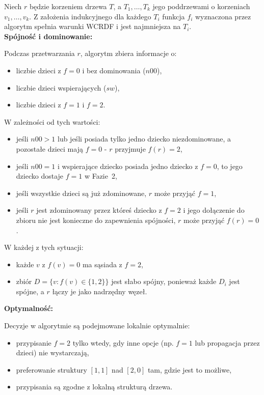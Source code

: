 Niech $r$ będzie korzeniem drzewa $T$, a $T_1, \dots, T_k$ jego poddrzewami o korzeniach $v_1, \dots, v_k$. Z założenia indukcyjnego dla każdego $T_i$ funkcja $f_i$ wyznaczona przez algorytm spełnia warunki WCRDF i jest najmniejsza na $T_i$.\\
\textbf{Spójność i dominowanie:}

Podczas przetwarzania $r$, algorytm zbiera informacje o:
\begin{itemize}
\item liczbie dzieci z $f=0$ i bez dominowania ($n00$),
\item liczbie dzieci wspierających ($sw$),
\item liczbie dzieci z $f=1$ i $f=2$.
\end{itemize}

W zależności od tych wartości:
\begin{itemize}
\item jeśli $n00 > 1$ lub jeśli posiada tylko jedno dziecko niezdominowane, a pozostałe dzieci mają $f = 0$ - $r$ przyjmuje $f(r) = 2$,
\item jeśli $n00 = 1$ i wspierające dziecko posiada jedno dziecko z $f=0$, to jego dziecko dostaje $f=1$ w Fazie~2,
\item jeśli wszystkie dzieci są już zdominowane, $r$ może przyjąć $f = 1$,
\item jeśli $r$ jest zdominowany przez któreś dziecko z $f = 2$ i jego dołączenie do zbioru nie jest konieczne do zapewnienia spójności, $r$ może przyjąć $f(r) = 0$.
\end{itemize}

W każdej z tych sytuacji:
\begin{itemize}
\item każde $v$ z $f(v)=0$ ma sąsiada z $f=2$,
\item zbiór $D = \{v : f(v) \in \{1,2\}\}$ jest słabo spójny, ponieważ każde $D_i$ jest spójne, a $r$ łączy je jako nadrzędny węzeł.
\end{itemize}
\textbf{Optymalność:}

Decyzje w algorytmie są podejmowane lokalnie optymalnie:
\begin{itemize}
\item przypisanie $f = 2$ tylko wtedy, gdy inne opcje (np. $f=1$ lub propagacja przez dzieci) nie wystarczają,
\item preferowanie struktury $[1,1]$ nad $[2,0]$ tam, gdzie jest to możliwe,
\item przypisania są zgodne z lokalną strukturą drzewa.
\end{itemize}

